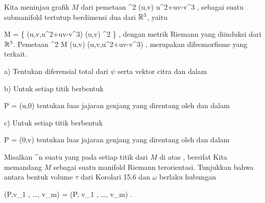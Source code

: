 {}
{

Kita meninjau grafik $M$ dari pemetaan
\maabbeledisp {\varphi} {\R^2} {\R
} {(u,v)} { u^2+uv-v^3
} {,} sebagai suatu submanifold tertutup berdimensi dua dari ${\mathbb R}^3$, yaitu

\mavergleichskettedisp
{\vergleichskette
{ M
}
{ =} { \left\{ (u,v,u^2+uv-v^3)  \mid  (u,v) \in \R^2         \right\}
}
{ } {
}
{ } {
}
{ } {
}
}
{}{}{,}
dengan metrik Riemann yang diinduksi dari ${\mathbb R}^3$. Pemetaan
\maabbeledisp {\psi} {\R^2} { M
} {(u,v)} { (u,v,u^2+uv-v^3)
} {,}
merupakan difeomorfisme yang terkait.

a) Tentukan diferensial total dari $\psi$ serta vektor citra
 dan
 dalam

b) Untuk setiap titik berbentuk

\mavergleichskette
{\vergleichskette
{ P
}
{ = }{ (u,0)
}
{  }{
}
{    }{
}
{   }{
}
}
{}{}{}
tentukan luas jajaran genjang yang direntang oleh
 dan
 dalam

c) Untuk setiap titik berbentuk

\mavergleichskette
{\vergleichskette
{ P
}
{ = }{ (0,v)
}
{  }{
}
{    }{
}
{   }{
}
}
{}{}{}
tentukan luas jajaran genjang yang direntang oleh
 dan
 dalam

}
{} {}

{}
{

Misalkan
\maabbdisp {\varphi} {\R^n } {\R
} {}
 {} {}
suatu
yang pada setiap titik dari
$M$ di atas
\mathl{0 \in \R}{}, bersifat
Kita memandang $M$ sebagai suatu manifold Riemann terorientasi. Tunjukkan bahwa antara bentuk volume $\tau$ dari
Korolari 15.6
dan
$\omega$ berlaku hubungan

\mavergleichskettedisp
{\vergleichskette
{\tau(P,v_1 , \ldots , v_m)
}
{ =} { \pm {} \Vert  \omega(P, v_1 , \ldots , v_m)
}
{ } {
}
{ } {
}
{ } {
}
}
{}{}{.}

}
{} {}

